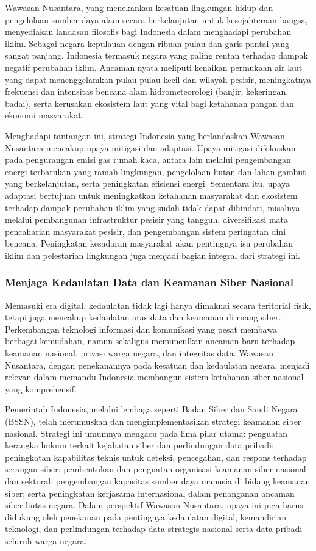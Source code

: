 \documentclass[12pt, a4paper]{article}
\begin{document}
Wawasan Nusantara, yang menekankan kesatuan lingkungan hidup dan pengelolaan sumber daya alam secara berkelanjutan untuk kesejahteraan bangsa, menyediakan landasan filosofis bagi Indonesia dalam menghadapi perubahan iklim. Sebagai negara kepulauan dengan ribuan pulau dan garis pantai yang sangat panjang, Indonesia termasuk negara yang paling rentan terhadap dampak negatif perubahan iklim. Ancaman nyata meliputi kenaikan permukaan air laut yang dapat menenggelamkan pulau-pulau kecil dan wilayah pesisir, meningkatnya frekuensi dan intensitas bencana alam hidrometeorologi (banjir, kekeringan, badai), serta kerusakan ekosistem laut yang vital bagi ketahanan pangan dan ekonomi masyarakat.  

Menghadapi tantangan ini, strategi Indonesia yang berlandaskan Wawasan Nusantara mencakup upaya mitigasi dan adaptasi. Upaya mitigasi difokuskan pada pengurangan emisi gas rumah kaca, antara lain melalui pengembangan energi terbarukan yang ramah lingkungan, pengelolaan hutan dan lahan gambut yang berkelanjutan, serta peningkatan efisiensi energi. Sementara itu, upaya adaptasi bertujuan untuk meningkatkan ketahanan masyarakat dan ekosistem terhadap dampak perubahan iklim yang sudah tidak dapat dihindari, misalnya melalui pembangunan infrastruktur pesisir yang tangguh, diversifikasi mata pencaharian masyarakat pesisir, dan pengembangan sistem peringatan dini bencana. Peningkatan kesadaran masyarakat akan pentingnya isu perubahan iklim dan pelestarian lingkungan juga menjadi bagian integral dari strategi ini.  

\subsubsection{Menjaga Kedaulatan Data dan Keamanan Siber Nasional}

Memasuki era digital, kedaulatan tidak lagi hanya dimaknai secara teritorial fisik, tetapi juga mencakup kedaulatan atas data dan keamanan di ruang siber. Perkembangan teknologi informasi dan komunikasi yang pesat membawa berbagai kemudahan, namun sekaligus memunculkan ancaman baru terhadap keamanan nasional, privasi warga negara, dan integritas data. Wawasan Nusantara, dengan penekanannya pada kesatuan dan kedaulatan negara, menjadi relevan dalam memandu Indonesia membangun sistem ketahanan siber nasional yang komprehensif.  

Pemerintah Indonesia, melalui lembaga seperti Badan Siber dan Sandi Negara (BSSN), telah merumuskan dan mengimplementasikan strategi keamanan siber nasional. Strategi ini umumnya mengacu pada lima pilar utama: penguatan kerangka hukum terkait kejahatan siber dan perlindungan data pribadi; peningkatan kapabilitas teknis untuk deteksi, pencegahan, dan respons terhadap serangan siber; pembentukan dan penguatan organisasi keamanan siber nasional dan sektoral; pengembangan kapasitas sumber daya manusia di bidang keamanan siber; serta peningkatan kerjasama internasional dalam penanganan ancaman siber lintas negara. Dalam perspektif Wawasan Nusantara, upaya ini juga harus didukung oleh penekanan pada pentingnya kedaulatan digital, kemandirian teknologi, dan perlindungan terhadap data strategis nasional serta data pribadi seluruh warga negara.  
\end{document}
